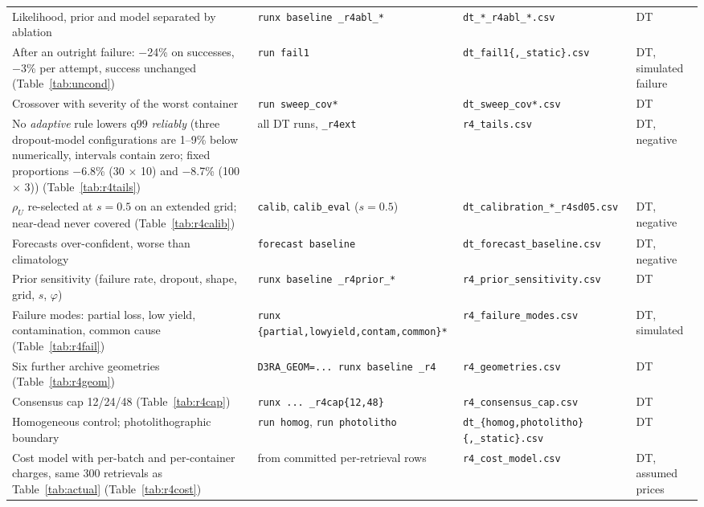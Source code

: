 \begin{table}[!t]
\begin{tabular}{@{}p{66mm}p{42mm}p{46mm}p{22mm}@{}}
Likelihood, prior and model separated by ablation & \texttt{runx baseline \_r4abl\_*} & \texttt{dt\_*\_r4abl\_*.csv} & DT \\
After an outright failure: $-$24\% on successes, $-$3\% per attempt, success unchanged (Table~\ref{tab:uncond}) & \texttt{run fail1} & \texttt{dt\_fail1\{,\_static\}.csv} & DT, simulated failure \\
Crossover with severity of the worst container & \texttt{run sweep\_cov*} & \texttt{dt\_sweep\_cov*.csv} & DT \\
No \emph{adaptive} rule lowers q99 \emph{reliably} (three dropout-model configurations are 1--9\% below numerically, intervals contain zero; fixed proportions $-$6.8\% (30 $\times$ 10) and $-$8.7\% (100 $\times$ 3)) (Table~\ref{tab:r4tails}) & all DT runs, \texttt{\_r4ext} & \texttt{r4\_tails.csv} & DT, negative \\
$\rho_U$ re-selected at $s{=}0.5$ on an extended grid; near-dead never covered (Table~\ref{tab:r4calib}) & \texttt{calib}, \texttt{calib\_eval} ($s{=}0.5$) & \texttt{dt\_calibration\_*\_r4sd05.csv} & DT, negative \\
Forecasts over-confident, worse than climatology & \texttt{forecast baseline} & \texttt{dt\_forecast\_baseline.csv} & DT, negative \\
Prior sensitivity (failure rate, dropout, shape, grid, $s$, $\varphi$) & \texttt{runx baseline \_r4prior\_*} & \texttt{r4\_prior\_sensitivity.csv} & DT \\
Failure modes: partial loss, low yield, contamination, common cause (Table~\ref{tab:r4fail}) & \texttt{runx \{partial,}\allowbreak\texttt{lowyield,contam,common\}*} & \texttt{r4\_failure\_modes.csv} & DT, simulated \\
Six further archive geometries (Table~\ref{tab:r4geom}) & \texttt{D3RA\_GEOM=... runx baseline \_r4} & \texttt{r4\_geometries.csv} & DT \\
Consensus cap 12/24/48 (Table~\ref{tab:r4cap}) & \texttt{runx ... \_r4cap\{12,48\}} & \texttt{r4\_consensus\_cap.csv} & DT \\
Homogeneous control; photolithographic boundary & \texttt{run homog}, \texttt{run photolitho} & \texttt{dt\_\{homog,}\allowbreak\texttt{photolitho\}\{,\_static\}.csv} & DT \\
Cost model with per-batch and per-container charges, same 300 retrievals as Table~\ref{tab:actual} (Table~\ref{tab:r4cost}) & from committed per-retrieval rows & \texttt{r4\_cost\_model.csv} & DT, assumed prices \\

\end{tabular}
\end{table}
